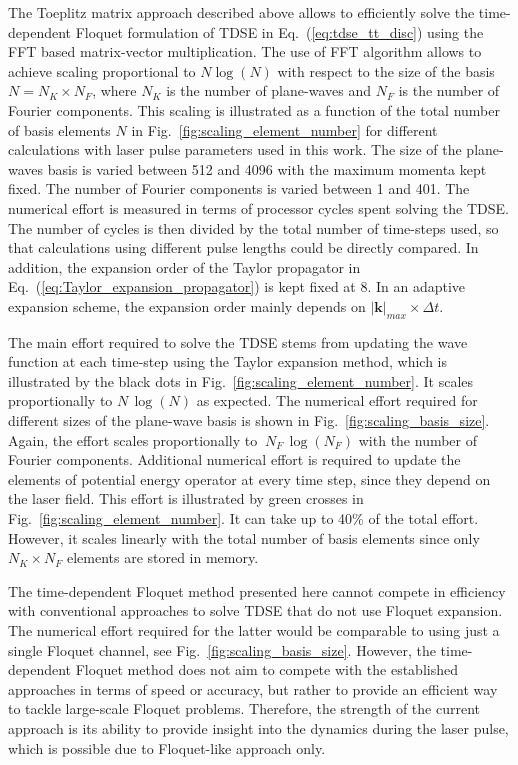 \documentclass[
pra%
,preprint%
,amssymb, nobibnotes, aps, superscriptaddress, floatfix]{revtex4}
\newcommand{\kv}{\mathbf{k}}
\begin{document}
The Toeplitz matrix approach described above allows to efficiently solve the time-dependent Floquet formulation of TDSE in Eq.~(\ref{eq:tdse_tt_disc}) using the FFT based matrix-vector multiplication. The use of FFT algorithm allows to achieve scaling proportional to $N\log(N)$ with respect to the size of the basis $N=N_K \times N_F$, where $N_K$ is the number of plane-waves and $N_F$ is the number of Fourier components. 
This scaling is illustrated as a function of the total number of basis elements $N$ in Fig.~\ref{fig:scaling_element_number} for different calculations with laser pulse parameters used in this work. The size of the plane-waves basis is varied between 512 and 4096 with the maximum momenta kept fixed. The number of Fourier components is varied between 1 and 401. The numerical effort is measured in terms of processor cycles spent solving the TDSE. The number of cycles is then divided by the total number of time-steps used, so that calculations using different pulse lengths could be directly compared. In addition, the expansion order of the Taylor propagator in Eq.~(\ref{eq:Taylor_expansion_propagator}) is kept fixed at 8. In an adaptive expansion scheme, the expansion order mainly depends on $|\kv|_{max} \times \Delta t$.

The main effort required to solve the TDSE stems from updating the wave function at each time-step using the Taylor expansion method, which is illustrated by the black dots in Fig.~\ref{fig:scaling_element_number}. It scales proportionally to $N \, \log(N)$ as expected. The numerical effort required for different sizes of the plane-wave basis is shown in Fig.~\ref{fig:scaling_basis_size}. Again, the effort scales proportionally to $~N_F \, \log(N_F)$ with the number of Fourier components.
Additional numerical effort is required to update the elements of potential energy operator at every time step, since they depend on the laser field. This effort is illustrated by green crosses in Fig.~\ref{fig:scaling_element_number}. It can take up to 40\% of the total effort. However, it scales linearly with the total number of basis elements since only $N_K \times N_F$ elements are stored in memory.

The time-dependent Floquet method presented here cannot compete in efficiency with conventional approaches to solve TDSE that do not use Floquet expansion. The numerical effort required for the latter would be comparable to using just a single Floquet channel, see Fig.~\ref{fig:scaling_basis_size}. However, the time-dependent Floquet method does not aim to compete with the established approaches in terms of speed or accuracy, but rather to provide an efficient way to tackle large-scale Floquet problems. Therefore, the strength of the current approach is its ability to provide insight into the dynamics during the laser pulse, which is possible due to Floquet-like approach only. 
\end{document}
